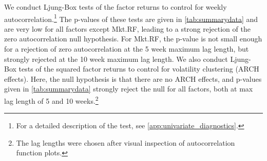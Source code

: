 We conduct Ljung-Box tests of the factor returns to control for weekly autocorrelation.\footnote{For a detailed description of the test, see \autoref{app:univariate_diagnostics}.} The p-values of these tests are given in \autoref{tab:summarydata} and are very low for all factors except Mkt.RF, leading to a strong rejection of the zero autocorrelation null hypothesis. For Mkt.RF, the p-value is not small enough for a rejection of zero autocorrelation at the 5 week maximum lag length, but strongly rejected at the 10 week maximum lag length. We also conduct Ljung-Box tests of the squared factor returns to control for volatility clustering (ARCH effects). Here, the null hypothesis is that there are no ARCH effects, and p-values given in \autoref{tab:summarydata} strongly reject the null for all factors, both at max lag length of 5 and 10 weeks.\footnote{The lag lengths were chosen after visual inspection of autocorrelation function  plots.}

